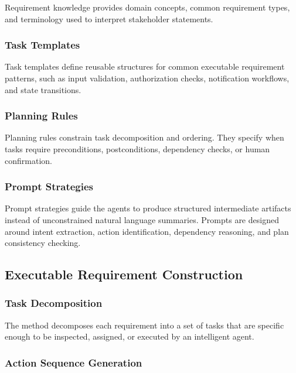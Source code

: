 Requirement knowledge provides domain concepts, common requirement types, and terminology used to interpret stakeholder statements.

\subsubsection{Task Templates}
\label{sec:method-task-templates}

Task templates define reusable structures for common executable requirement patterns, such as input validation, authorization checks, notification workflows, and state transitions.

\subsubsection{Planning Rules}
\label{sec:method-planning-rules}

Planning rules constrain task decomposition and ordering.
They specify when tasks require preconditions, postconditions, dependency checks, or human confirmation.

\subsubsection{Prompt Strategies}
\label{sec:method-prompts}

Prompt strategies guide the agents to produce structured intermediate artifacts instead of unconstrained natural language summaries.
Prompts are designed around intent extraction, action identification, dependency reasoning, and plan consistency checking.

\subsection{Executable Requirement Construction}
\label{sec:method-construction}

\subsubsection{Task Decomposition}
\label{sec:method-task-decomposition}

The method decomposes each requirement into a set of tasks that are specific enough to be inspected, assigned, or executed by an intelligent agent.

\subsubsection{Action Sequence Generation}
\label{sec:method-action-sequence}

